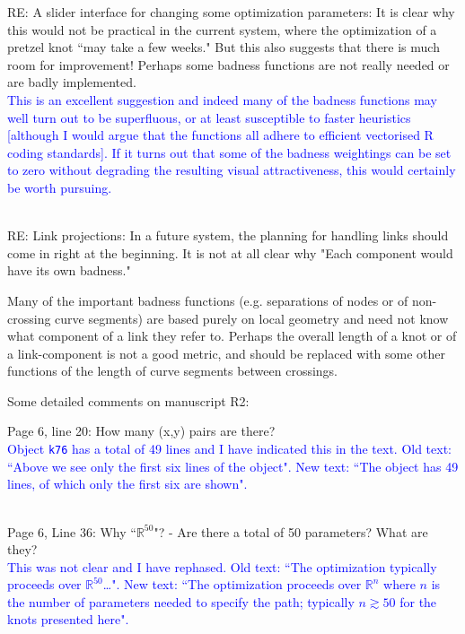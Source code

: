 \documentclass[12pt]{article}
\begin{document}
RE: A slider interface for changing some optimization parameters: It
is clear why this would not be practical in the current system, where
the optimization of a pretzel knot ``may take a few weeks."  But this
also suggests that there is much room for improvement!  Perhaps some
badness functions are not really needed or are badly implemented.
\textcolor{blue}{\\ This is an excellent suggestion and indeed many of
  the badness functions may well turn out to be superfluous, or at
  least susceptible to faster heuristics [although I would argue that
    the functions all adhere to efficient vectorised R coding
    standards].  If it turns out that some of the badness weightings
  can be set to zero without degrading the resulting visual
  attractiveness, this would certainly be worth pursuing.\\ \\}

RE: Link projections: In a future system, the planning for handling
links should come in right at the beginning.  It is not at all clear
why "Each component would have its own badness."

Many of the important badness functions (e.g. separations of nodes or
of non-crossing curve segments) are based purely on local geometry and
need not know what component of a link they refer to.  Perhaps the
overall length of a knot or of a link-component is not a good metric,
and should be replaced with some other functions of the length of
curve segments between crossings.

Some detailed comments on manuscript R2:

Page 6, line 20: How many (x,y) pairs are there?
\textcolor{blue}{\\Object {\tt k76} has a total of 49 lines and I have
  indicated this in the text.  Old text: ``Above we see only the first
  six lines of the object".  New text: ``The object has 49 lines, of
  which only the first six are shown".\\ \\}

Page 6, Line 36: Why ``$\mathbb{R}^{50}$"? - Are there a total of 50
parameters?  What are they?  \textcolor{blue}{\\This was not clear and
  I have rephased.  Old text: ``The optimization typically proceeds
  over $\mathbb{R}^{50}$\ldots". New text: ``The optimization
  proceeds over $\mathbb{R}^n$ where $n$ is the number of parameters
  needed to specify the path; typically $n\gtrsim 50$ for the knots
  presented here".\\ \\}
\end{document}
